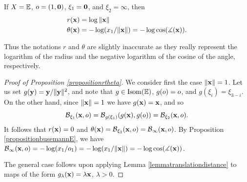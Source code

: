 \begin{proposition}
\label{propositionrtheta}
If $X = \E$, $o = (1,\mathbf 0)$, $\xi_1 = \mathbf 0$, and $\xi_2 = \infty$, then
\begin{align*}
r(\mathbf x) &= \log \|\mathbf x\| \\
\theta(\mathbf x) &= -\log(x_1/\|\mathbf x\|) = -\log \cos(\measuredangle(\mathbf x)).
\end{align*}
\end{proposition}
Thus the notations $r$ and $\theta$ are slightly inaccurate as they really represent the logarithm of the radius and the negative logarithm of the cosine of the angle, respectively.
\begin{proof}[Proof of Proposition \ref{propositionrtheta}]
We consider first the case $\|\mathbf x\| = 1$. Let us set $g(\mathbf y) = \mathbf y/\|\mathbf y\|^2$, and note that $g\in\Isom(\E)$, $g(o) = o$, and $g(\xi_i) = \xi_{3 - i}$. On the other hand, since $\|\mathbf x\| = 1$ we have $g(\mathbf x) = \mathbf x$, and so
\[
\operatorname{\mathcal B}_{\xi_1}(\mathbf x,o) = \operatorname{\mathcal B}_{g(\xi_1)}(g(\mathbf x),g(o)) = \operatorname{\mathcal B}_{\xi_2}(\mathbf x,o).
\]
It follows that $r(\mathbf x) = 0$ and $\theta(\mathbf x) = \operatorname{\mathcal B}_{\xi_2}(\mathbf x,o) = \operatorname{\mathcal B}_\infty(\mathbf x,o)$. By Proposition \ref{propositionbusemannE}, we have $\operatorname{\mathcal B}_\infty(\mathbf x,o) = -\log(x_1/o_1) = -\log(x_1/\|\mathbf x\|) = -\log\cos(\measuredangle(\mathbf x))$.

The general case follows upon applying Lemma \ref{lemmatranslationdistance} to maps of the form $g_\lambda(\mathbf x) = \lambda\mathbf x$, $\lambda > 0$.
\end{proof}

